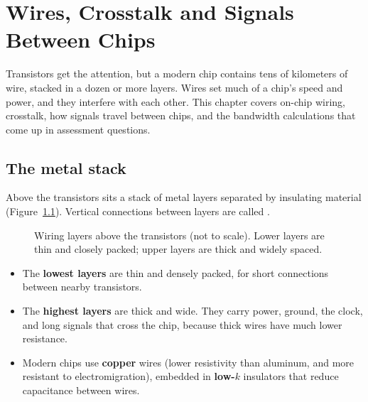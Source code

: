 \chapter{Wires, Crosstalk and Signals Between Chips}
\label{ch:wires}

Transistors get the attention, but a modern chip contains tens of kilometers of wire, stacked in a dozen or more layers. Wires set much of a chip's speed and power, and they interfere with each other. This chapter covers on-chip wiring, crosstalk, how signals travel between chips, and the bandwidth calculations that come up in assessment questions.

\section{The metal stack}

Above the transistors sits a stack of metal layers separated by insulating material (Figure~\ref{fig:metalstack}). Vertical connections between layers are called .

\begin{figure}[h]
\centering
{}
\caption{Wiring layers above the transistors (not to scale). Lower layers are thin and closely packed; upper layers are thick and widely spaced.}
\label{fig:metalstack}
\end{figure}

\begin{itemize}
  \item The \textbf{lowest layers} are thin and densely packed, for short connections between nearby transistors.
  \item The \textbf{highest layers} are thick and wide. They carry power, ground, the clock, and long signals that cross the chip, because thick wires have much lower resistance.
  \item Modern chips use \textbf{copper} wires (lower resistivity than aluminum, and more resistant to electromigration), embedded in \textbf{low-$k$} insulators that reduce capacitance between wires.
\end{itemize}

